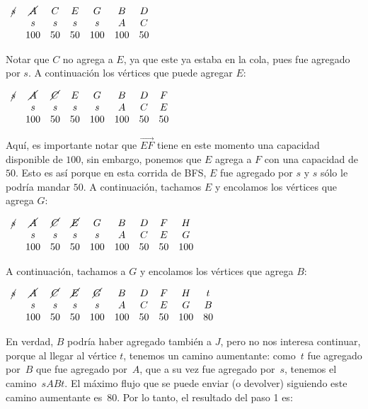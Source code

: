 \documentclass[10pt,a4paper]{article}
\begin{document}
$\begin{array}{ccccccc} \cancel{s} & \cancel{A} & C & E &G & B &D \\ & s & s & s & s & A &C\\ & 100 & 50 & 50 & 100 & 100&50\\ \end{array}$

Notar que $C$ no agrega a $E$, ya que este ya estaba en la cola, pues fue agregado por $s$. A continuación los vértices que puede agregar $E$:

$\begin{array}{cccccccc} \cancel{s} & \cancel{A} & \cancel{C} & E &G & B &D & F\\ & s & s & s & s & A &C &E\\ & 100 & 50 & 50 & 100 & 100&50 &50\\ \end{array}$

Aquí, es importante notar que $\overrightarrow{EF}$ tiene en este momento una capacidad disponible de $100$, sin embargo, ponemos que $E$ agrega a $F$ con una capacidad de $50$. Esto es así porque en esta corrida de BFS, $E$ fue agregado por $s$ y $s$ sólo le podría mandar $50$. A continuación, tachamos $E$ y encolamos los vértices que agrega $G$:

$\begin{array}{ccccccccc} \cancel{s} & \cancel{A} & \cancel{C} & \cancel{E} &G & B &D & F & H\\ & s & s & s & s & A &C &E &G\\ & 100 & 50 & 50 & 100 & 100&50 &50 &100\\ \end{array}$

A continuación, tachamos a $G$ y encolamos los vértices que agrega $B$:

$\begin{array}{cccccccccc} \cancel{s} & \cancel{A} & \cancel{C} & \cancel{E} & \cancel{G} & B &D & F & H & t\\ & s & s & s & s & A &C &E &G & B\\ & 100 & 50 & 50 & 100 & 100&50 &50 &100 & 80\\ \end{array}$

En verdad, $B$ podría haber agregado también a $J$, pero no nos interesa continuar, porque al llegar al vértice $t$, tenemos un camino aumentante: como $t$ fue agregado por $B$ que fue agregado por $A$, que a su vez fue agregado por $s$, tenemos el camino $sABt$. El máximo flujo que se puede enviar (o devolver) siguiendo este camino aumentante es $80$. Por lo tanto, el resultado del paso 1 es:
\end{document}
